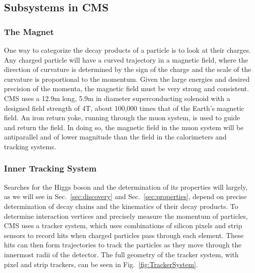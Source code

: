 \subsection{Subsystems in CMS}
\label{sec:CMSSubsystem}

\subsubsection{The Magnet}
\label{sec:Magnet}

One way to categorize the decay products of a particle is to look at their charges. Any charged particle will have a curved trajectory in a magnetic field, where the direction of curvature is determined by the sign of the charge and the scale of the curvature is proportional to the momentum. Given the large energies and desired precision of the momenta, the magnetic field must be very strong and consistent. CMS uses a 12.9m long, 5.9m in diameter superconducting solenoid with a designed field strength of 4T, about 100,000 times that of the Earth's magnetic field. An iron return yoke, running through the muon system, is used to guide and return the field. In doing so, the magnetic field in the muon system will be antiparallel and of lower magnitude than the field in the calorimeters and tracking systems.

\subsubsection{Inner Tracking System}
\label{sec:Tracker}

Searches for the Higgs boson and the determination of its properties will largely, as we will see in Sec.~\ref{sec:discovery} and Sec.~\ref{sec:properties}, depend on precise determination of decay chains and the kinematics of their decay products. To determine interaction vertices and precisely measure the momentum of particles, CMS uses a tracker system, which uses combinations of silicon pixels and strip sensors to record hits when charged particles pass through each element. These hits can then form trajectories to track the particles as they move through the innermost radii of the detector. The full geometry of the tracker system, with pixel and strip trackers, can be seen in Fig.~\ref{fig:TrackerSystem}.

